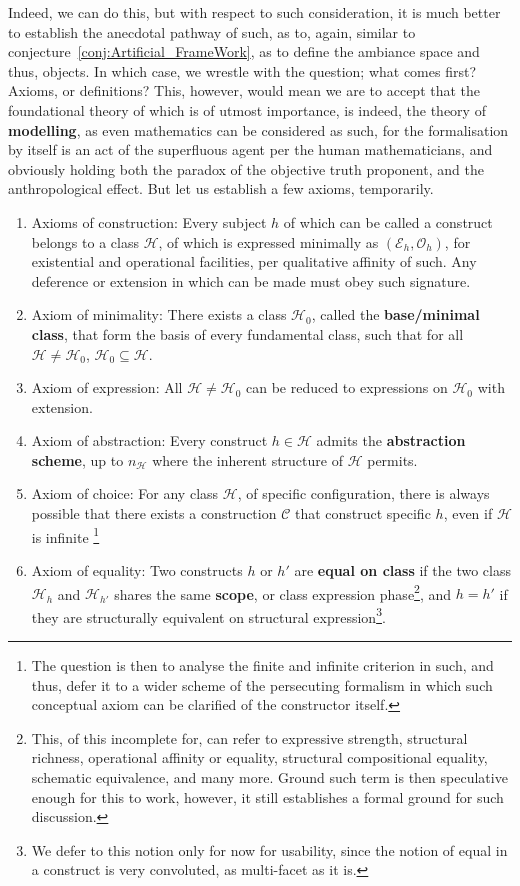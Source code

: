 \begin{note}
    Indeed, we can do this, but with respect to such consideration, it is much better to establish the anecdotal pathway of such, as to, again, similar to conjecture~\ref{conj:Artificial_FrameWork}, as to define the ambiance space and thus, objects. In which case, we wrestle with the question; what comes first? Axioms, or definitions? This, however, would mean we are to accept that the foundational theory of which is of utmost importance, is indeed, the theory of \textbf{modelling}, as even mathematics can be considered as such, for the formalisation by itself is an act of the superfluous agent per the human mathematicians, and obviously holding both the paradox of the objective truth proponent, and the anthropological effect. But let us establish a few axioms, temporarily. 
    \begin{enumerate}
        \item Axioms of construction: Every subject $h$ of which can be called a construct belongs to a class $\mathcal{H}$, of which is expressed minimally as $(\mathcal{E}_{h},\mathcal{O}_{h})$, for existential and operational facilities, per qualitative affinity of such. Any deference or extension in which can be made must obey such signature. 
        \item Axiom of minimality: There exists a class $\mathcal{H}_{0}$, called the \textbf{base/minimal class}, that form the basis of every fundamental class, such that for all $\mathcal{H}\neq \mathcal{H}_{0}$, $\mathcal{H}_{0}\subseteq \mathcal{H}$. 
        \item Axiom of expression: All $\mathcal{H}\neq \mathcal{H}_{0}$ can be reduced to expressions on $\mathcal{H}_{0}$ with extension. 
        \item Axiom of abstraction: Every construct $h\in \mathcal{H}$ admits the \textbf{abstraction scheme}, up to $n_{\mathcal{H}}$ where the inherent structure of $\mathcal{H}$ permits. 
        \item Axiom of choice: For any class $\mathcal{H}$, of specific configuration, there is always possible that there exists a construction $\mathcal{C}$ that construct specific $h$, even if $\mathcal{H}$ is infinite \footnote{The question is then to analyse the finite and infinite criterion in such, and thus, defer it to a wider scheme of the persecuting formalism in which such conceptual axiom can be clarified of the constructor itself.} 
        \item Axiom of equality: Two constructs $h$ or $h'$ are \textbf{equal on class} if the two class $\mathcal{H}_{h}$ and $\mathcal{H}_{h'}$ shares the same \textbf{scope}, or class expression phase\footnote{This, of this incomplete for, can refer to expressive strength, structural richness, operational affinity or equality, structural compositional equality, schematic equivalence, and many more. Ground such term is then speculative enough for this to work, however, it still establishes a formal ground for such discussion.}, and $h=h'$ if they are structurally equivalent on structural expression\footnote{We defer to this notion only for now for usability, since the notion of equal in a construct is very convoluted, as multi-facet as it is.}. 

\end{enumerate}
\end{note}
